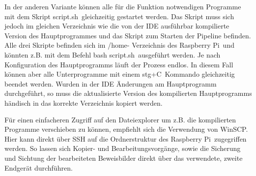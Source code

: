 In der anderen Variante können alle für die Funktion notwendigen Programme mit dem Skript \glqq script.sh\grqq\ gleichzeitig gestartet werden. Das Skript muss sich jedoch im gleichen Verzeichnis wie die von der IDE ausführbar kompilierte Version des Hauptprogrammes und das Skript zum Starten der Pipeline befinden. Alle drei Skripte befinden sich im /home- Verzeichnis des \glqq Raspberry Pi\grqq\  und könnten z.B. mit dem Befehl \glqq bash script.sh\grqq\ ausgeführt werden. Je nach Konfiguration des Hauptprogramms läuft der Prozess endlos. In diesem Fall können aber alle Unterprogramme mit einem \glqq stg+C\grqq\ Kommando gleichzeitig beendet werden. Wurden in der IDE Änderungen am Hauptprogramm durchgeführt, so muss die aktualisierte Version des kompilierten Hauptprogramms händisch in das korrekte Verzeichnis kopiert werden. 

Für einen einfacheren Zugriff auf den Dateiexplorer um z.B. die kompilierten Programme verschieben zu können, empfiehlt sich die Verwendung von \glqq WinSCP\grqq. Hier kann direkt über SSH auf die Ordnerstruktur des \glqq Raspberry Pi\grqq\ zugegriffen werden. So lassen sich Kopier- und Bearbeitungsvorgänge, sowie die Sicherung und Sichtung der bearbeiteten Beweisbilder direkt über das verwendete, zweite Endgerät durchführen.

\newpage
